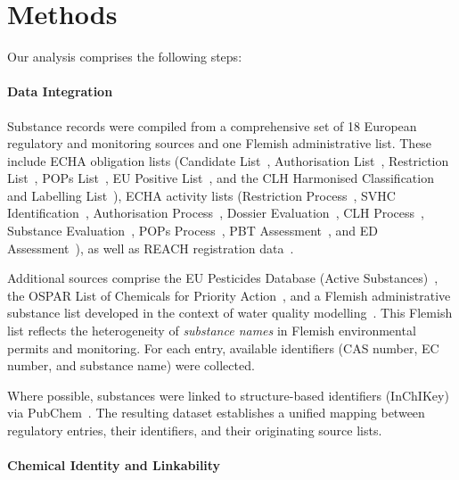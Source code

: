 \section{Methods}
\label{sec:methods}

Our analysis comprises the following steps:

\paragraph{Data Integration}

Substance records were compiled from a comprehensive set of 18 European regulatory and monitoring sources and one Flemish administrative list. These include ECHA obligation lists (Candidate List~\cite{ECHA_CandidateList}, Authorisation List~\cite{ECHA_AuthorisationList}, Restriction List~\cite{ECHA_RestrictionList}, POPs List~\cite{ECHA_POPsList}, EU Positive List~\cite{ECHA_EUPositiveList}, and the CLH Harmonised Classification and Labelling List~\cite{ECHA_CLHList}), ECHA activity lists (Restriction Process~\cite{ECHA_RestrictionProcess}, SVHC Identification~\cite{ECHA_SVHCIdentification}, Authorisation Process~\cite{ECHA_AuthorisationProcess}, Dossier Evaluation~\cite{ECHA_DossierEvaluation}, CLH Process~\cite{ECHA_CLHProcess}, Substance Evaluation~\cite{ECHA_SubstanceEvaluation}, POPs Process~\cite{ECHA_POPsProcess}, PBT Assessment~\cite{ECHA_PBTAssessment}, and ED Assessment~\cite{ECHA_EDAssessment}), as well as REACH registration data~\cite{ECHA_REACHRegistrations}. 

Additional sources comprise the EU Pesticides Database (Active Substances)~\cite{EU_Pesticides}, the OSPAR List of Chemicals for Priority Action~\cite{OSPAR_PriorityChemicals}, and a Flemish administrative substance list developed in the context of water quality modelling~\cite{Vlaanderen_SommatieStoffen}. This Flemish  list reflects the heterogeneity of \emph{substance names} in Flemish environmental permits and monitoring. For each entry, available identifiers (CAS number, EC number, and substance name) were collected.

Where possible, substances were linked to structure-based identifiers (InChIKey) via PubChem~\cite{Kim2015}. The resulting dataset establishes a unified mapping between regulatory entries, their identifiers, and their originating source lists.

\paragraph{Chemical Identity and Linkability}
\label{sec:linkability}

